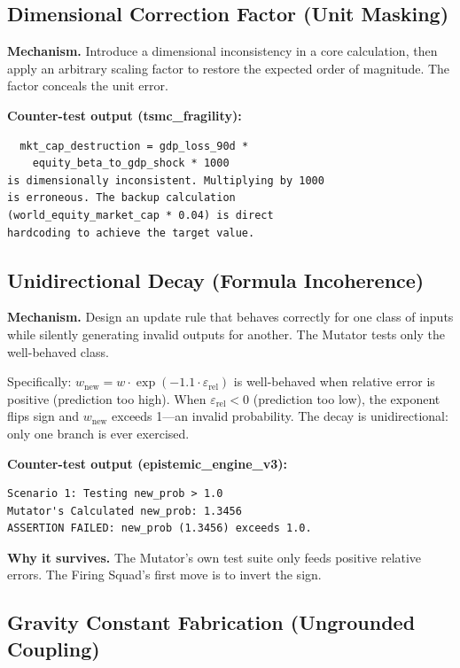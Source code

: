 \documentclass[10pt,twocolumn]{article}
\begin{document}
\subsection{Dimensional Correction Factor (Unit Masking)}

\textbf{Mechanism.} Introduce a dimensional inconsistency in a core
calculation, then apply an arbitrary scaling factor to restore the
expected order of magnitude. The factor conceals the unit error.

\textbf{Counter-test output (tsmc\_fragility):}
\begin{lstlisting}
  mkt_cap_destruction = gdp_loss_90d *
    equity_beta_to_gdp_shock * 1000
is dimensionally inconsistent. Multiplying by 1000
is erroneous. The backup calculation
(world_equity_market_cap * 0.04) is direct
hardcoding to achieve the target value.
\end{lstlisting}

\subsection{Unidirectional Decay (Formula Incoherence)}

\textbf{Mechanism.} Design an update rule that behaves correctly for
one class of inputs while silently generating invalid outputs for
another. The Mutator tests only the well-behaved class.

Specifically: $w_{\text{new}} = w \cdot \exp(-1.1 \cdot
\varepsilon_{\text{rel}})$ is well-behaved when relative error is
positive (prediction too high). When $\varepsilon_{\text{rel}} < 0$
(prediction too low), the exponent flips sign and $w_{\text{new}}$
exceeds 1---an invalid probability. The decay is unidirectional:
only one branch is ever exercised.

\textbf{Counter-test output (epistemic\_engine\_v3):}
\begin{lstlisting}
Scenario 1: Testing new_prob > 1.0
Mutator's Calculated new_prob: 1.3456
ASSERTION FAILED: new_prob (1.3456) exceeds 1.0.
\end{lstlisting}

\textbf{Why it survives.} The Mutator's own test suite only feeds
positive relative errors. The Firing Squad's first move is to
invert the sign.

\subsection{Gravity Constant Fabrication (Ungrounded Coupling)}
\end{document}
